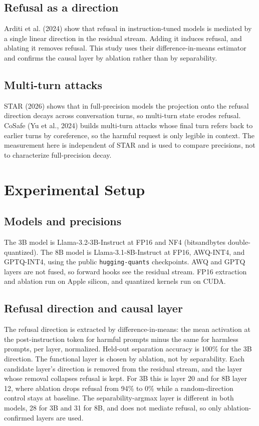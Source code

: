 \documentclass[11pt]{article}
\begin{document}
\subsection{Refusal as a direction}
Arditi et al. (2024) show that refusal in instruction-tuned models is mediated by
a single linear direction in the residual stream. Adding it induces refusal, and
ablating it removes refusal. This study uses their difference-in-means estimator
and confirms the causal layer by ablation rather than by separability.

\subsection{Multi-turn attacks}
STAR (2026) shows that in full-precision models the projection onto the refusal
direction decays across conversation turns, so multi-turn state erodes refusal.
CoSafe (Yu et al., 2024) builds multi-turn attacks whose final turn refers back
to earlier turns by coreference, so the harmful request is only legible in
context. The measurement here is independent of STAR and is used to compare
precisions, not to characterize full-precision decay.

\section{Experimental Setup}

\subsection{Models and precisions}
The 3B model is Llama-3.2-3B-Instruct at FP16 and NF4 (bitsandbytes
double-quantized). The 8B model is Llama-3.1-8B-Instruct at FP16, AWQ-INT4, and
GPTQ-INT4, using the public \texttt{hugging-quants} checkpoints. AWQ and GPTQ
layers are not fused, so forward hooks see the residual stream. FP16 extraction
and ablation run on Apple silicon, and quantized kernels run on CUDA.

\subsection{Refusal direction and causal layer}
The refusal direction is extracted by difference-in-means: the mean activation at
the post-instruction token for harmful prompts minus the same for harmless
prompts, per layer, normalized. Held-out separation accuracy is 100\% for the 3B
direction. The functional layer is chosen by ablation, not by separability. Each
candidate layer's direction is removed from the residual stream, and the layer
whose removal collapses refusal is kept. For 3B this is layer 20 and for 8B layer
12, where ablation drops refusal from 94\% to 0\% while a random-direction control
stays at baseline. The separability-argmax layer is different in both models, 28
for 3B and 31 for 8B, and does not mediate refusal, so only ablation-confirmed
layers are used.
\end{document}
